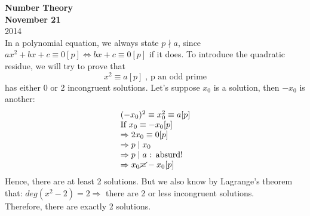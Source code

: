 \documentclass{report}
\newcommand{\nequiv}{\cancel{\equiv}}
\begin{document}
{\centering
\Large
\textbf{Number Theory}\\
\normalsize
\textbf{November 21}\\
2014\\
}
\vspace{10mm}
\vspace{10mm}
In a polynomial equation, we always state $p\nmid a$, since \\$ax^2+bx+c\equiv 0 [p] \iff bx+c\equiv 0[p]$ if it does.
To introduce the quadratic residue, we will try to prove that \[x^2\equiv a [p] \;\text{, p an odd prime}\] has either 0 or 2 incongruent solutions. Let's suppose $x_0$ is a solution, then $-x_0$ is another:
																																		\[\begin{array}{lcl}
																																							(-x_0)^2\equiv x_0^2 \equiv a[p]\\
																																							\text{If }x_0\equiv -x_0 [p]\\
																																							\Rightarrow 2x_0\equiv 0[p]\\
																																							\Rightarrow p\mid x_0 \\
																																							\Rightarrow p\mid a\text{ :   absurd!}\\
																																							\Rightarrow x_0 \nequiv -x_0 [p]
																																		\end{array}\]
Hence, there are at least 2 solutions. But  we also know by Lagrange's theorem that: $deg(x^2-2)=2 \Rightarrow$ there are 2 or less incongruent solutions.\\
Therefore, there are exactly 2 solutions.\\
\end{document}
